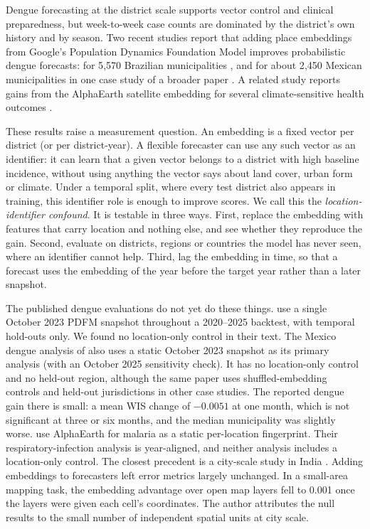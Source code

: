 \documentclass[11pt]{article}
\begin{document}
Dengue forecasting at the district scale supports vector control and clinical preparedness,
but week-to-week case counts are dominated by the district's own history and by season.
Two recent studies report that adding place embeddings from Google's Population Dynamics
Foundation Model \citep[PDFM;][]{agarwal2024pdfm} improves probabilistic dengue forecasts:
for 5{,}570 Brazilian municipalities \citep{brittain2026foundation}, and for about 2{,}450 Mexican
municipalities in one case study of a broader paper \citep{muslim2026planetary}. A related study
reports gains from the AlphaEarth satellite embedding \citep{brown2025alphaearth} for several
climate-sensitive health outcomes \citep{nazir2026alphaearth}.

These results raise a measurement question. An embedding is a fixed vector per district (or per
district-year). A flexible forecaster can use any such vector as an identifier: it can learn
that a given vector belongs to a district with high baseline incidence, without using anything
the vector says about land cover, urban form or climate. Under a temporal split, where every test
district also appears in training, this identifier role is enough to improve scores. We call
this the \emph{location-identifier confound}. It is testable in three ways. First, replace the
embedding with features that carry location and nothing else, and see whether they reproduce the
gain. Second, evaluate on districts, regions or countries the model has never seen, where an
identifier cannot help. Third, lag the embedding in time, so that a forecast uses the embedding
of the year before the target year rather than a later snapshot.

The published dengue evaluations do not yet do these things. \citet{brittain2026foundation} use
a single October 2023 PDFM snapshot throughout a 2020--2025 backtest, with temporal hold-outs only.
We found no location-only control in their text. The Mexico dengue analysis of
\citet{muslim2026planetary} also uses a static October 2023 snapshot as its primary analysis (with
an October 2025 sensitivity check). It has no location-only control and no held-out region,
although the same paper uses shuffled-embedding controls and held-out jurisdictions in other case
studies. The reported dengue gain there is small: a mean WIS change of $-0.0051$ at one month,
which is not significant at three or six months, and the median municipality was slightly worse.
\citet{nazir2026alphaearth} use AlphaEarth for malaria as a static per-location fingerprint. Their
respiratory-infection analysis is year-aligned, and neither analysis includes a location-only
control. The closest precedent is a city-scale study in India \citep{pradhan2026benchmarks}. Adding
embeddings to forecasters left error metrics largely unchanged. In a small-area mapping task, the
embedding advantage over open map layers fell to 0.001 once the layers were given each cell's
coordinates. The author attributes the null results to the small number of independent spatial
units at city scale.
\end{document}
